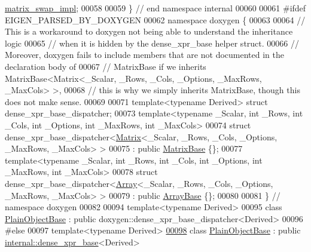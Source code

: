 \begin{DoxyCode}
      \hyperlink{struct_eigen_1_1internal_1_1matrix__swap__impl}{matrix\_swap\_impl};
00058 
00059 \} \textcolor{comment}{// end namespace internal}
00060 
00061 \textcolor{preprocessor}{#ifdef EIGEN\_PARSED\_BY\_DOXYGEN}
00062 \textcolor{keyword}{namespace }doxygen \{
00063 
00064 \textcolor{comment}{// This is a workaround to doxygen not being able to understand the inheritance logic}
00065 \textcolor{comment}{// when it is hidden by the dense\_xpr\_base helper struct.}
00066 \textcolor{comment}{// Moreover, doxygen fails to include members that are not documented in the declaration body of}
00067 \textcolor{comment}{// MatrixBase if we inherits MatrixBase<Matrix<\_Scalar, \_Rows, \_Cols, \_Options, \_MaxRows, \_MaxCols> >,}
00068 \textcolor{comment}{// this is why we simply inherits MatrixBase, though this does not make sense.}
00069 
00071 \textcolor{keyword}{template}<\textcolor{keyword}{typename} Derived> \textcolor{keyword}{struct }dense\_xpr\_base\_dispatcher;
00073 \textcolor{keyword}{template}<\textcolor{keyword}{typename} \_Scalar, \textcolor{keywordtype}{int} \_Rows, \textcolor{keywordtype}{int} \_Cols, \textcolor{keywordtype}{int} \_Options, \textcolor{keywordtype}{int} \_MaxRows, \textcolor{keywordtype}{int} \_MaxCols>
00074 \textcolor{keyword}{struct }dense\_xpr\_base\_dispatcher<\hyperlink{group___core___module_class_eigen_1_1_matrix}{Matrix}<\_Scalar, \_Rows, \_Cols, \_Options, \_MaxRows, \_MaxCols> >
00075     : \textcolor{keyword}{public} \hyperlink{group___core___module_class_eigen_1_1_matrix_base}{MatrixBase} \{\};
00077 \textcolor{keyword}{template}<\textcolor{keyword}{typename} \_Scalar, \textcolor{keywordtype}{int} \_Rows, \textcolor{keywordtype}{int} \_Cols, \textcolor{keywordtype}{int} \_Options, \textcolor{keywordtype}{int} \_MaxRows, \textcolor{keywordtype}{int} \_MaxCols>
00078 \textcolor{keyword}{struct }dense\_xpr\_base\_dispatcher<\hyperlink{group___core___module_class_eigen_1_1_array}{Array}<\_Scalar, \_Rows, \_Cols, \_Options, \_MaxRows, \_MaxCols> >
00079     : \textcolor{keyword}{public} \hyperlink{group___core___module_class_eigen_1_1_array_base}{ArrayBase} \{\};
00080 
00081 \} \textcolor{comment}{// namespace doxygen}
00082 
00094 \textcolor{keyword}{template}<\textcolor{keyword}{typename} Derived>
00095 \textcolor{keyword}{class }\hyperlink{class_eigen_1_1_plain_object_base}{PlainObjectBase} : \textcolor{keyword}{public} doxygen::dense\_xpr\_base\_dispatcher<Derived>
00096 \textcolor{preprocessor}{#else}
00097 template<typename Derived>
\hyperlink{class_eigen_1_1_plain_object_base}{00098} class \hyperlink{class_eigen_1_1_plain_object_base}{PlainObjectBase} : \textcolor{keyword}{public} \hyperlink{struct_eigen_1_1internal_1_1dense__xpr__base}{internal::dense\_xpr\_base}<Derived>

\end{DoxyCode}
